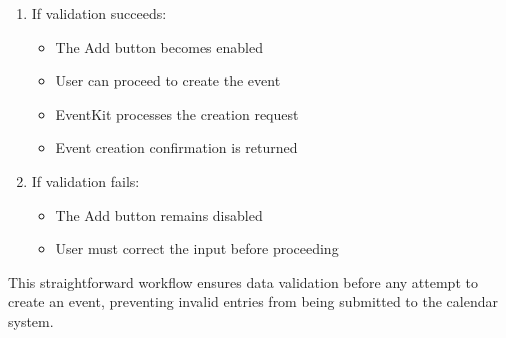 \begin{enumerate}
  \item If validation succeeds:
        \begin{itemize}
          \item The Add button becomes enabled
          \item User can proceed to create the event
          \item EventKit processes the creation request
          \item Event creation confirmation is returned
        \end{itemize}
  \item If validation fails:
        \begin{itemize}
          \item The Add button remains disabled
          \item User must correct the input before proceeding
        \end{itemize}
\end{enumerate}

This straightforward workflow ensures data validation before any attempt to create an event, preventing invalid entries from being submitted to the calendar system.